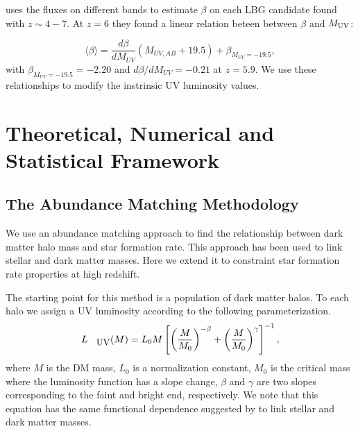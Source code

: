 \documentclass{emulateapj}
\begin{document}
\citet{Bouwens12} uses the fluxes on different bands to estimate $\beta$ on each LBG 
candidate found with $z \sim 4-7$. 
At $z=6$ they found a linear relation beteen between $\beta$ and
$M_{\rm UV}$:

\begin{equation}
\langle \beta \rangle = \frac{d \beta}{d M_{UV}} \left( M_{UV,AB}+19.5 \right) 
                                   + \beta_{M_{UV}=-19.5},
\end{equation}
with $ \beta_{M_{UV}=-19.5} = -2.20$ and $d \beta/d M_{UV} = -0.21$ at
$z=5.9$. 
We use these relationships to modify the instrinsic UV luminosity
values.




\section{Theoretical, Numerical and Statistical Framework}
\label{sec:methodology}


\subsection{The Abundance Matching Methodology}
We use an abundance matching approach to find the relationship between
dark matter halo mass and star formation rate. 
This approach has been used to link stellar and dark matter masses. 
Here we extend it to constraint star formation rate properties at high
redshift. 

The starting point for this method is a population of dark matter halos.
To each halo we assign a UV luminosity according to the following
parameterization.
  \begin{equation}\label{eqn:luminosity}
  L_{\textrm{\small{UV}}} (M) = L_{0} M \left[ \left( \frac{M}{M_0}\right)^{-\beta} 
		   + \left( \frac{M}{M_0}\right)^{\gamma} 
               \right]^{-1},
  \end{equation}
where $M$ is the DM mass, $L_{0}$ is a normalization constant, $M_0$
is the critical mass where the luminosity function has a slope change, 
$\beta$ and $\gamma$ are two slopes corresponding to the faint and
bright end, respectively. 
We note that this equation has the same functional dependence suggested
 by \citet{Moster10} to link stellar and dark matter masses.
\end{document}
